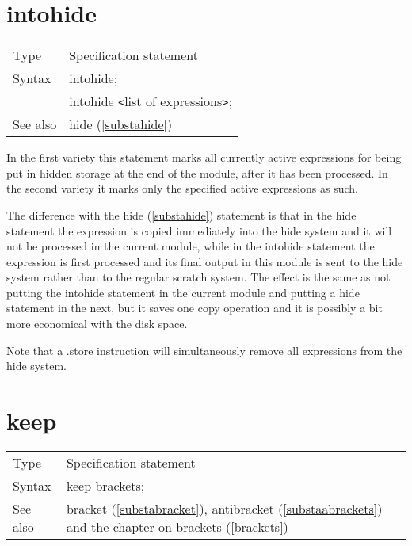 
\section{intohide}
\label{substaintohide}

\noindent \begin{tabular}{ll}
Type & Specification statement\\
Syntax & intohide; \\
       & intohide {\tt<}list of expressions{\tt>};
\\ See also & hide (\ref{substahide})
\end{tabular} \vspace{4mm}

\noindent In the first variety this statement marks all currently active 
expressions for being put in hidden storage at the end of the 
module, after it has been processed. In the second variety it marks only 
the specified active expressions as such. 
\vspace{4mm}

\noindent The difference with the hide (\ref{substahide}) statement is 
that in the hide statement the expression is copied immediately into the 
hide system and it will not be processed in the current module, while in 
the intohide statement the expression is first processed and its final 
output in this module is sent to the hide system rather than to the regular 
scratch system. The effect is the same as not putting the intohide 
statement in the current module and putting a hide statement in the next, 
but it saves one copy operation and it is possibly a bit more economical 
with the disk space.
\vspace{4mm}

\noindent Note that a .store instruction will simultaneously remove all 
expressions from the hide system. \vspace{10mm}

\section{keep}
\label{substakeep}

\noindent \begin{tabular}{ll}
Type & Specification statement\\
Syntax & keep brackets; \\
See also & bracket (\ref{substabracket}), antibracket 
     (\ref{substaabrackets}) and the chapter on brackets 
     (\ref{brackets})
\end{tabular} \vspace{4mm}

